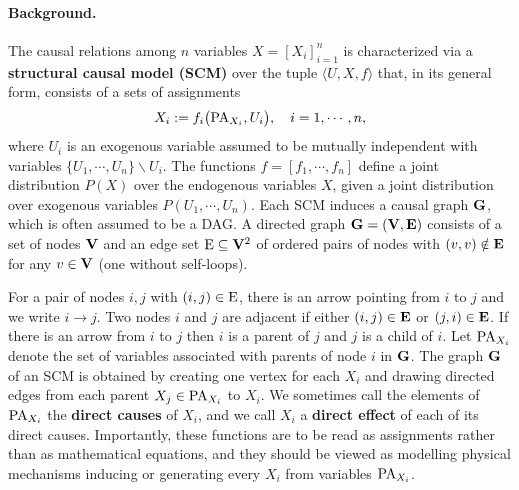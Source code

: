 \paragraph{Background.} The causal relations among $n$ variables $X = [X_i]^{n}_{i=1}$ is characterized via a \textbf{structural causal model (SCM)} \citep{pearl2009causality} over the tuple $\langle U, X, f \rangle$ that, in its general form, consists of a sets of assignments
\begin{align*}
    X_i := f_i \big(\textrm{PA}_{X_i}, U_i \big), \quad i = 1, \cdots, n,
\end{align*}
where $U_i$ is an exogenous variable assumed to be mutually independent with variables $\{U_1, \cdots, U_n\} \backslash U_i$. The functions $f = \left[f_1, \cdots, f_n \right]$ define a joint distribution $P(X)$ over the endogenous variables $X$, given a joint distribution over exogenous variables $P(U_1, \cdots, U_n)$. Each SCM induces a causal graph ${\mathbf{G}}$, which is often assumed to be a DAG. A directed graph ${\mathbf{G}} = ({\mathbf{V}}, {\mathbf{E}})$ consists of a set of nodes ${\mathbf{V}}$ and an edge set ${\textnormal{E}} \subseteq {\mathbf{V}}^2$  of ordered pairs of
nodes with $(v, v) \notin {\mathbf{E}}$ for any $v \in {\mathbf{V}}$ (one without self-loops). 

For a pair of nodes $i,j$ with $(i,j) \in {\textnormal{E}}$, there is an arrow pointing from $i$ to $j$ and we write $i \rightarrow j$. Two nodes $i$ and $j$ are adjacent if either $(i,j) \in {\mathbf{E}}$ or $(j,i) \in {\mathbf{E}}$. If there is an arrow from $i$ to $j$ then $i$ is a parent of $j$ and $j$ is a child of $i$. Let $\textrm{PA}_{X_i}$ denote the set of variables associated with parents of node $i$ in ${\mathbf{G}}$. The graph ${\mathbf{G}}$ of an SCM is obtained by creating one vertex for each $X_i$ and drawing directed edges from each parent $X_j \in \textrm{PA}_{X_i}$ to $X_i$. We sometimes call the elements of $\textrm{PA}_{X_i}$ the \textbf{direct causes} of $X_i$, and we call $X_i$ a \textbf{direct effect} of each of its direct causes. Importantly, these functions are to be read as assignments rather than as mathematical equations, and they should be viewed as modelling physical mechanisms inducing or generating every $X_i$ from variables $\textrm{PA}_{X_i}$. 




 